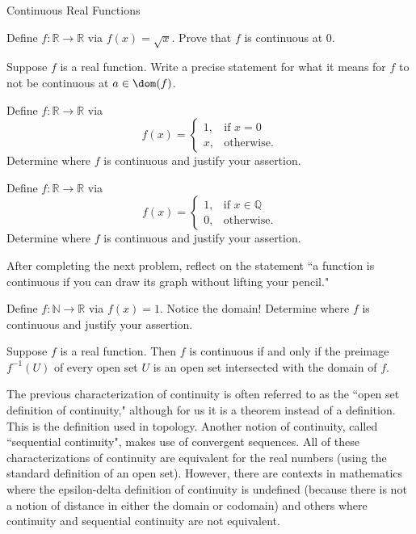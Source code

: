 \begin{section}{Continuous Real Functions}
\begin{problem}
Define $f:\mathbb{R}\to\mathbb{R}$ via $f(x)=\sqrt{x}$. Prove that $f$ is continuous at 0.
\end{problem}

\begin{problem}
Suppose $f$ is a real function. Write a precise statement for what it means for $f$ to not be continuous at $a\in\dom(f)$.
\end{problem}

\begin{problem}
Define $f:\mathbb{R}\to\mathbb{R}$ via 
\[
f(x)=\begin{cases}
1, & \text{if }x=0\\
x, & \text{otherwise}.
\end{cases}
\]
Determine where $f$ is continuous and justify your assertion.
\end{problem}

\begin{problem}
Define $f:\mathbb{R}\to\mathbb{R}$ via 
\[
f(x)=\begin{cases}
1, & \text{if }x\in \mathbb{Q}\\
0, & \text{otherwise}.
\end{cases}
\]
Determine where $f$ is continuous and justify your assertion.
\end{problem}

After completing the next problem, reflect on the statement ``a function is continuous if you can draw its graph without lifting your pencil."

\begin{problem}
Define $f:\mathbb{N}\to\mathbb{R}$ via $f(x)=1$. Notice the domain! Determine where $f$ is continuous and justify your assertion.
\end{problem}

\begin{theorem}\label{thm:inverse images open sets}
Suppose $f$ is a real function. Then $f$ is continuous if and only if the preimage $f^{-1}(U)$ of every open set $U$ is an open set intersected with the domain of $f$.
\end{theorem}

The previous characterization of continuity is often referred to as the ``open set definition of continuity," although for us it is a theorem instead of a definition. This is the definition used in topology. Another notion of continuity, called ``sequential continuity", makes use of convergent sequences.  All of these characterizations of continuity are equivalent for the real numbers (using the standard definition of an open set). However, there are contexts in mathematics where the epsilon-delta definition of continuity is undefined (because there is not a notion of distance in either the domain or codomain) and others where continuity and sequential continuity are not equivalent.


\end{section}
